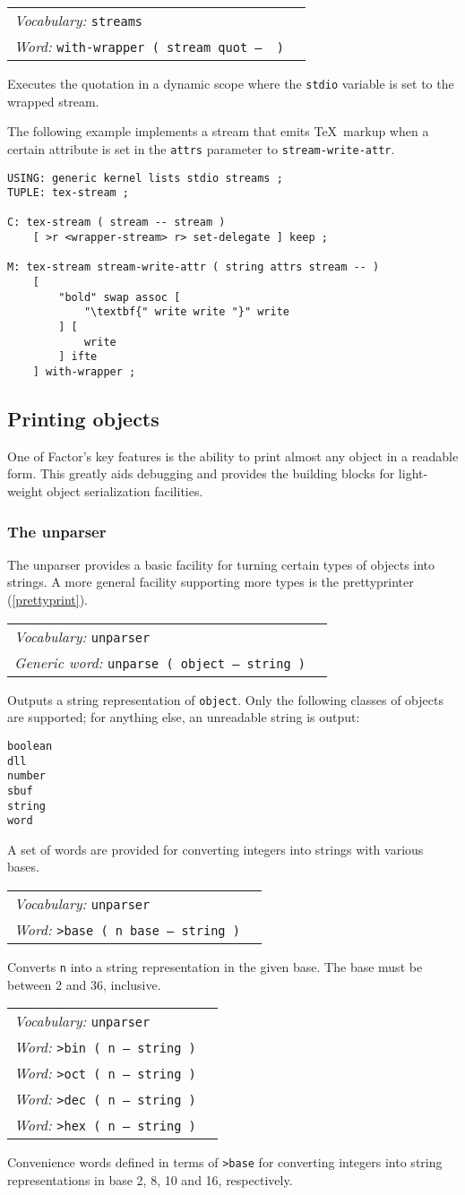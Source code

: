 \documentclass{book}
\newcommand{\vocabulary}[1]{\emph{Vocabulary:} \texttt{#1}&\\}
\newcommand{\ordinaryword}[2]{\index{\texttt{#1}}\emph{Word:} \texttt{#2}&\\}
\newcommand{\genericword}[2]{\index{\texttt{#1}}\emph{Generic word:} \texttt{#2}&\\}
\newcommand{\wordtable}[1]{


\begin{tabularx}{12cm}{lX}
\hline
#1
\hline
\end{tabularx}

}
\begin{document}
\wordtable{
\vocabulary{streams}
\ordinaryword{with-wrapper}{with-wrapper~( stream quot -- ~)}
}
Executes the quotation in a dynamic scope where the \texttt{stdio} variable is set to the wrapped stream.

The following example implements a stream that emits \TeX\ markup when a certain attribute is set in the \texttt{attrs} parameter to \texttt{stream-write-attr}.

\begin{verbatim}
USING: generic kernel lists stdio streams ;
TUPLE: tex-stream ;

C: tex-stream ( stream -- stream )
    [ >r <wrapper-stream> r> set-delegate ] keep ;

M: tex-stream stream-write-attr ( string attrs stream -- )
    [
        "bold" swap assoc [
            "\textbf{" write write "}" write
        ] [
            write
        ] ifte
    ] with-wrapper ;
\end{verbatim}

\subsection{Printing objects}


One of Factor's key features is the ability to print almost any object in a readable form. This greatly aids debugging and provides the building blocks for light-weight object serialization facilities.

\subsubsection{The unparser}

The unparser provides a basic facility for turning certain types of objects into strings. A more general facility supporting more types is the prettyprinter (\ref{prettyprint}).

\wordtable{
\vocabulary{unparser}
\genericword{unparse}{unparse~( object -- string~)}
}
Outputs a string representation of \texttt{object}. Only the following classes of objects are supported; for anything else, an unreadable string is output:
\begin{verbatim}
boolean
dll
number
sbuf
string
word
\end{verbatim}
A set of words are provided for converting integers into strings with various bases.
\wordtable{
\vocabulary{unparser}
\ordinaryword{>base}{>base~( n base -- string~)}
}
Converts \texttt{n} into a string representation in the given base. The base must be between 2 and 36, inclusive.
\wordtable{
\vocabulary{unparser}
\ordinaryword{>bin}{>bin~( n -- string~)}
\ordinaryword{>oct}{>oct~( n -- string~)}
\ordinaryword{>dec}{>dec~( n -- string~)}
\ordinaryword{>hex}{>hex~( n -- string~)}
}
Convenience words defined in terms of \texttt{>base} for converting integers into string representations in base 2, 8, 10 and 16, respectively.
\end{document}
